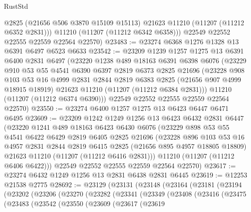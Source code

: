 \begin{lexlean}{RustStd}
\begin{coremodule}
          @2825
          (@21656 @506 @3870 @15109 @15113)
          @21623
          @11210
          (@11207 (@11212 @6352 @2831)))
        @11210
        (@11207 (@11212 @6342 @6358)))
      @22549
      @22552
      @22555
      @22559
      @22564
      @22570)
@23483 := @23274 @6368 @1276 @1328 @13 @6391 @6497 @6523 @6633
@23542 := @23209
    @1239
    @1257
    @1275
    @13
    @6391
    @6400
    @2831
    @6497
    (@23220
      @1238
      @489
      @18163
      @6391
      @6398
      @6076
      (@23229
        @910
        @53
        @55
        @4541
        @6390
        @6397
        @2819
        @6373
        @2825
        @21696
        (@23228
          @908
          @103
          @53
          @16
          @4999
          @2831
          @2844
          @2819
          @6383
          @2825
          (@21656 @907 @4999 @18915 @18919)
          @21623
          @11210
          (@11207 (@11212 @6384 @2831)))
        @11210
        (@11207 (@11212 @6374 @6390)))
      @22549
      @22552
      @22555
      @22559
      @22564
      @22570)
@23550 := @23274 @6400 @1257 @1275 @13 @6423 @6447 @6471 @6495
@23609 := @23209
    @1242
    @1249
    @1256
    @13
    @6423
    @6432
    @2831
    @6447
    (@23220
      @1241
      @489
      @18163
      @6423
      @6430
      @6076
      (@23229
        @898
        @53
        @55
        @4541
        @6422
        @6429
        @2819
        @6405
        @2825
        @21696
        (@23228
          @896
          @103
          @53
          @16
          @4957
          @2831
          @2844
          @2819
          @6415
          @2825
          (@21656 @895 @4957 @18805 @18809)
          @21623
          @11210
          (@11207 (@11212 @6416 @2831)))
        @11210
        (@11207 (@11212 @6406 @6422)))
      @22549
      @22552
      @22555
      @22559
      @22564
      @22570)
@23617 := @23274 @6432 @1249 @1256 @13 @2831 @6438 @2831 @6445
@23619 := @12253 @21538 @2775
@28692 := @23129
    (@23131
      (@23148
        (@23164
          (@23181
            (@23194
              (@23202
                (@23206
                  (@23270
                    (@23282
                      (@23341
                        (@23349
                          (@23408
                            (@23416
                              (@23475
                                (@23483
                                  (@23542
                                    (@23550
                                      (@23609
                                        (@23617
                                          (@23619

\end{coremodule}
\end{lexlean}
